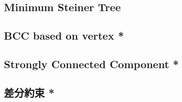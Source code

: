 \documentclass[a4paper,10pt,twocolumn,oneside]{article}
\begin{document}
% 

% 

\subsection{Minimum Steiner Tree}


\subsection{BCC based on vertex *}


\subsection{Strongly Connected Component *}


% 

% 

% 

% 

\subsection{差分約束 *}

\end{document}
